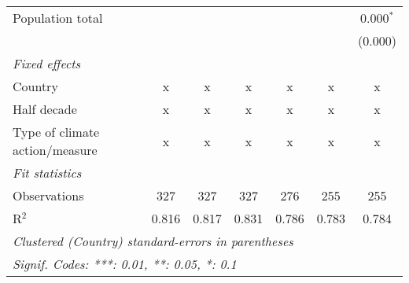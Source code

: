 \begin{tabular}{lcccccc}
   Population total                                                  &         &         &                &                &                & 0.000$^{*}$\\   
                                                                     &         &         &                &                &                & (0.000)\\   
   \emph{Fixed effects}\\
   Country                                                           & x       & x       & x              & x              & x              & x\\  
   Half decade                                                       & x       & x       & x              & x              & x              & x\\  
   Type of climate action/measure                                    & x       & x       & x              & x              & x              & x\\  
   \midrule \emph{Fit statistics}\\
   Observations                                                      & 327     & 327     & 327            & 276            & 255            & 255\\  
   R$^2$                                                             & 0.816   & 0.817   & 0.831          & 0.786          & 0.783          & 0.784\\  
   \midrule
   \multicolumn{7}{l}{\emph{Clustered (Country) standard-errors in parentheses}}\\
   \multicolumn{7}{l}{\emph{Signif. Codes: ***: 0.01, **: 0.05, *: 0.1}}\\
\end{tabular}
\par\endgroup


